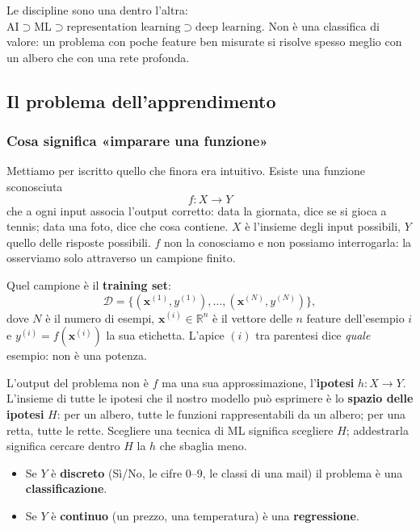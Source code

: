 \documentclass[12pt]{extarticle}
\begin{document}
\noindent Le discipline sono una dentro l'altra: $\text{AI} \supset \text{ML} \supset \text{representation learning} \supset \text{deep learning}$. Non è una classifica di valore: un problema con poche feature ben misurate si risolve spesso meglio con un albero che con una rete profonda.

\subsection{Il problema dell'apprendimento}

\subsubsection{Cosa significa «imparare una funzione»}

\noindent Mettiamo per iscritto quello che finora era intuitivo. Esiste una funzione sconosciuta
\[
f: X \to Y
\]
che a ogni input associa l'output corretto: data la giornata, dice se si gioca a tennis; data una foto, dice che cosa contiene. $X$ è l'insieme degli input possibili, $Y$ quello delle risposte possibili. $f$ non la conosciamo e non possiamo interrogarla: la osserviamo solo attraverso un campione finito.

\noindent Quel campione è il \textbf{training set}:
\[
\mathcal{D} = \{(\mathbf{x}^{(1)}, y^{(1)}), \dots, (\mathbf{x}^{(N)}, y^{(N)})\},
\]
dove $N$ è il numero di esempi, $\mathbf{x}^{(i)} \in \mathbb{R}^n$ è il vettore delle $n$ feature dell'esempio $i$ e $y^{(i)} = f(\mathbf{x}^{(i)})$ la sua etichetta. L'apice $(i)$ tra parentesi dice \emph{quale} esempio: non è una potenza.

\noindent L'output del problema non è $f$ ma una sua approssimazione, l'\textbf{ipotesi} $h: X \to Y$. L'insieme di tutte le ipotesi che il nostro modello può esprimere è lo \textbf{spazio delle ipotesi} $H$: per un albero, tutte le funzioni rappresentabili da un albero; per una retta, tutte le rette. Scegliere una tecnica di ML significa scegliere $H$; addestrarla significa cercare dentro $H$ la $h$ che sbaglia meno.

\begin{itemize}
    \item Se $Y$ è \textbf{discreto} (Sì/No, le cifre 0--9, le classi di una mail) il problema è una \textbf{classificazione}.
    \item Se $Y$ è \textbf{continuo} (un prezzo, una temperatura) è una \textbf{regressione}.
\end{itemize}
\end{document}

